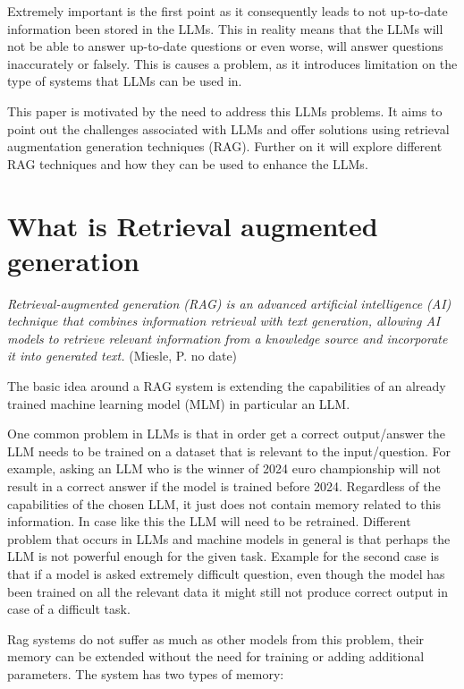 \documentclass{wseas}
\begin{document}
Extremely important is the first point as it consequently leads to
not up-to-date information been stored in the LLMs. This in reality means that
the LLMs will not be able to answer up-to-date questions or even worse, will
answer questions inaccurately or falsely. This is causes a problem, as it 
introduces limitation on the type of systems that LLMs can be used in.

This paper is motivated by the need to address this LLMs problems.
It aims to point out the challenges associated with LLMs and offer solutions
using retrieval augmentation generation techniques (RAG). 
Further on it will explore different RAG techniques and how they can be used  
to enhance the LLMs.

\section{What is Retrieval augmented generation}

\emph{Retrieval-augmented generation (RAG) is an advanced
 artificial intelligence (AI) technique that combines information 
 retrieval with text generation, allowing AI models to retrieve 
 relevant information from a knowledge source and incorporate it 
 into generated text.} (Miesle, P. no date) \cite{cite6}


The basic idea around a RAG system is extending the capabilities of an
already trained machine learning model (MLM) in particular an LLM.

One common problem in LLMs is that in order get a correct output/answer
the LLM needs to be trained on a dataset that is relevant to the
input/question. For example, asking an LLM who is the winner of 2024
euro championship will not result in a correct answer if the model is
trained before 2024. Regardless of the capabilities of the chosen LLM,
it just does not contain memory related to this information. In case
like this the LLM will need to be retrained. Different problem that
occurs in LLMs and machine models in general is that perhaps the LLM is
not powerful enough for the given task. Example for the second case is
that if a model is asked extremely difficult question, even though the
model has been trained on all the relevant data it might still not
produce correct output in case of a difficult task.

Rag systems do not suffer as much as other models from this problem,
their memory can be extended without the need for training or adding
additional parameters. The system has two types of memory:
\end{document}
